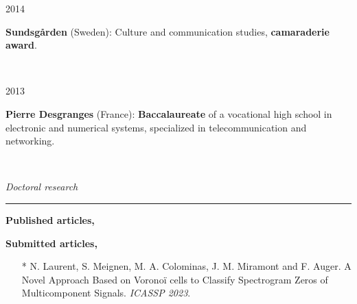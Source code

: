 \documentclass[a4paper,10pt]{article}
\begin{document}
	\noindent
	\begin{minipage}{0.20\textwidth}
		\color{MyGray} 2014
	\end{minipage}
	\hfill
	\begin{minipage}{0.70\textwidth}
		\textbf{Sundsgården} (Sweden): Culture and communication studies, \textbf{camaraderie award}.
	\end{minipage}\\
	\vspace{2mm}
	
	\noindent
	\begin{minipage}{0.20\textwidth}
		\color{MyGray} 2013
	\end{minipage}
	\hfill
	\begin{minipage}{0.70\textwidth}
		\textbf{Pierre Desgranges} (France): \textbf{Baccalaureate} of a vocational high school in electronic and numerical systems, specialized in telecommunication and networking.
	\end{minipage}\\
	\vspace{5mm}
	
	\noindent
	\textit{\Large \color{MyGray} \hspace{5mm} Doctoral research}
	\vspace{2mm}
	{\color{DefaultGray}\hrule height .1pt}
	\vspace{5mm}
	
	\textbf{Published articles,}
	\nocite{*}
	
	
	\vspace{5mm}
	
	
	\textbf{Submitted articles,}
	\begin{itemize}
		\setlength\itemsep{3mm}
		\item[*] N. Laurent, S. Meignen, M. A. Colominas, J. M. Miramont and F. Auger. A Novel Approach Based on Voronoï cells to Classify Spectrogram Zeros of Multicomponent Signals. \emph{ICASSP 2023}.
	\end{itemize}
	\vspace{5mm}
	
\end{document}
